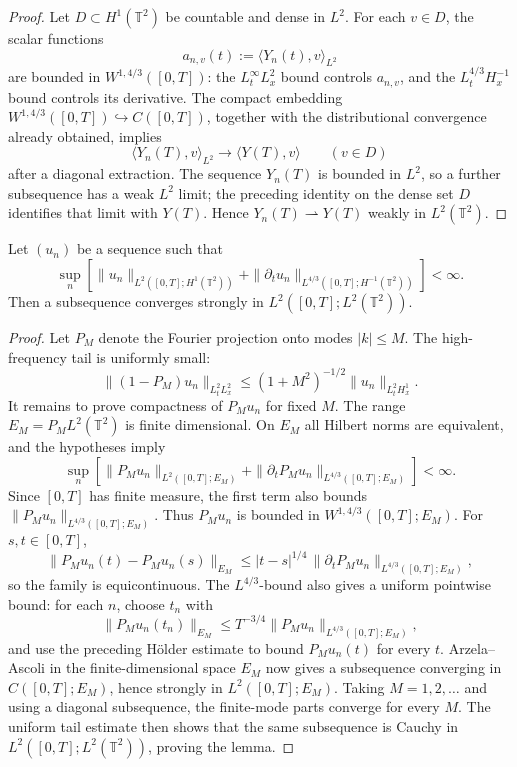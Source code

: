 \begin{proof}
Let \(D\subset H^1(\mathbb T^2)\) be countable and dense in \(L^2\).  For
each \(v\in D\), the scalar functions
\[
  a_{n,v}(t):=\langle Y_n(t),v\rangle_{L^2}
\]
are bounded in \(W^{1,4/3}([0,T])\): the \(L^\infty_tL^2_x\) bound controls
\(a_{n,v}\), and the \(L^{4/3}_tH^{-1}_x\) bound controls its derivative.
The compact embedding
\(W^{1,4/3}([0,T])\hookrightarrow C([0,T])\), together with the
distributional convergence already obtained, implies
\[
  \langle Y_n(T),v\rangle_{L^2}
  \longrightarrow
  \langle Y(T),v\rangle
  \qquad(v\in D)
\]
after a diagonal extraction.  The sequence \(Y_n(T)\) is bounded in
\(L^2\), so a further subsequence has a weak \(L^2\) limit; the preceding
identity on the dense set \(D\) identifies that limit with \(Y(T)\).  Hence
\(Y_n(T)\rightharpoonup Y(T)\) weakly in \(L^2(\mathbb T^2)\).
\end{proof}

\begin{lemma}
\label{lem:spde-fourier-aubin-lions}
Let \((u_n)\) be a sequence such that
\[
  \sup_n
  \left[
    \|u_n\|_{L^2([0,T];H^1(\mathbb T^2))}
    +
    \|\partial_tu_n\|_{L^{4/3}([0,T];H^{-1}(\mathbb T^2))}
  \right]
  <\infty .
\]
Then a subsequence converges strongly in
\(L^2([0,T];L^2(\mathbb T^2))\).
\end{lemma}

\begin{proof}
Let \(P_M\) denote the Fourier projection onto modes \(|k|\leq M\).  The
high-frequency tail is uniformly small:
\[
  \|(1-P_M)u_n\|_{L^2_tL^2_x}
  \leq
  (1+M^2)^{-1/2}
  \|u_n\|_{L^2_tH^1_x}.
\]
It remains to prove compactness of \(P_Mu_n\) for fixed \(M\).  The range
\(E_M=P_ML^2(\mathbb T^2)\) is finite dimensional.  On \(E_M\) all Hilbert
norms are equivalent, and the hypotheses imply
\[
  \sup_n
  \left[
    \|P_Mu_n\|_{L^2([0,T];E_M)}
    +
    \|\partial_tP_Mu_n\|_{L^{4/3}([0,T];E_M)}
  \right]
  <\infty .
\]
Since \([0,T]\) has finite measure, the first term also bounds
\(\|P_Mu_n\|_{L^{4/3}([0,T];E_M)}\).  Thus \(P_Mu_n\) is bounded in
\(W^{1,4/3}([0,T];E_M)\).  For \(s,t\in[0,T]\),
\[
  \|P_Mu_n(t)-P_Mu_n(s)\|_{E_M}
  \leq
  |t-s|^{1/4}\,
  \|\partial_tP_Mu_n\|_{L^{4/3}([0,T];E_M)} ,
\]
so the family is equicontinuous.  The \(L^{4/3}\)-bound also gives a
uniform pointwise bound: for each \(n\), choose \(t_n\) with
\[
  \|P_Mu_n(t_n)\|_{E_M}
  \leq
  T^{-3/4}\|P_Mu_n\|_{L^{4/3}([0,T];E_M)} ,
\]
and use the preceding Hölder estimate to bound \(P_Mu_n(t)\) for every
\(t\).  Arzela--Ascoli in the finite-dimensional space \(E_M\) now gives a
subsequence converging in \(C([0,T];E_M)\), hence strongly in
\(L^2([0,T];E_M)\).  Taking \(M=1,2,\ldots\) and using a diagonal
subsequence, the finite-mode parts converge for every \(M\).  The uniform
tail estimate then shows that the same subsequence is Cauchy in
\(L^2([0,T];L^2(\mathbb T^2))\), proving the lemma.
\end{proof}

